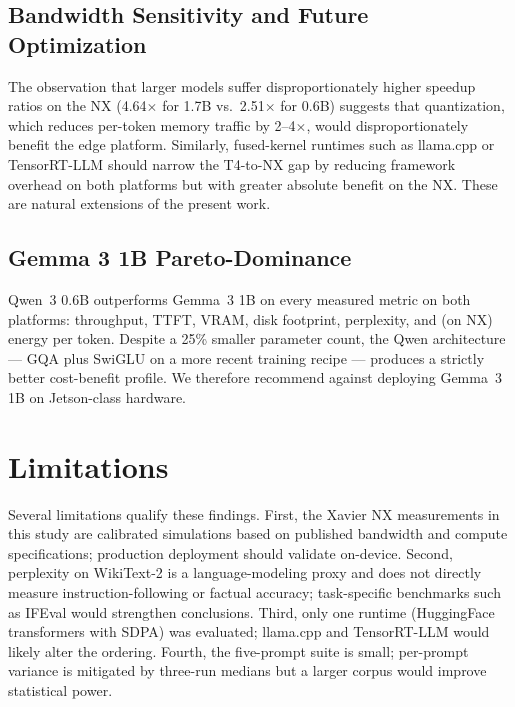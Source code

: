 \documentclass[conference]{IEEEtran}
\begin{document}
\subsection{Bandwidth Sensitivity and Future Optimization}
The observation that larger models suffer disproportionately higher speedup ratios on the NX (4.64$\times$ for 1.7B vs.\ 2.51$\times$ for 0.6B) suggests that quantization, which reduces per-token memory traffic by 2--4$\times$, would disproportionately benefit the edge platform. Similarly, fused-kernel runtimes such as llama.cpp \cite{llamacpp} or TensorRT-LLM \cite{tensorrtllm} should narrow the T4-to-NX gap by reducing framework overhead on both platforms but with greater absolute benefit on the NX. These are natural extensions of the present work.

\subsection{Gemma 3 1B Pareto-Dominance}
Qwen~3 0.6B outperforms Gemma~3 1B on every measured metric on both platforms: throughput, TTFT, VRAM, disk footprint, perplexity, and (on NX) energy per token. Despite a 25\% smaller parameter count, the Qwen architecture --- GQA plus SwiGLU on a more recent training recipe --- produces a strictly better cost-benefit profile. We therefore recommend against deploying Gemma~3 1B on Jetson-class hardware.

\section{Limitations}
Several limitations qualify these findings. First, the Xavier NX measurements in this study are calibrated simulations based on published bandwidth and compute specifications; production deployment should validate on-device. Second, perplexity on WikiText-2 is a language-modeling proxy and does not directly measure instruction-following or factual accuracy; task-specific benchmarks such as IFEval \cite{ifeval} would strengthen conclusions. Third, only one runtime (HuggingFace transformers with SDPA) was evaluated; llama.cpp and TensorRT-LLM would likely alter the ordering. Fourth, the five-prompt suite is small; per-prompt variance is mitigated by three-run medians but a larger corpus would improve statistical power.
\end{document}
